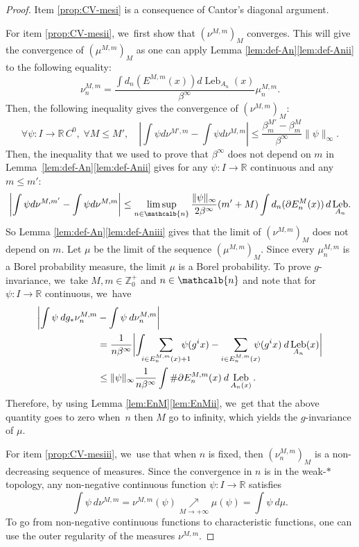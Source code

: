 \documentclass[JEP,XML,SOM,Unicode,NoFloatCountersInSection,published]{cedram}
\DeclareMathOperator{\Leb}{Leb}
\newcommand{\mcbn}{{\mathcalb{n}}}
\theoremstyle{definition}
\newcommand{\bbR}{{\mathbb{R}}}
\newcommand{\bbZ}{{\mathbb{Z}}}
\begin{document}
\begin{proof}
Item \eqref{prop:CV-mesi} is a consequence of Cantor's diagonal argument.

For item \eqref{prop:CV-mesii}, we~first show that $(\nu^{M,m})_M$ converges. This will give the convergence of $(\mu^{M,m})_M$ as one can apply Lemma \ref{lem:def-An}\eqref{lem:def-Anii} to the following equality:
\[
\nu_n^{M,m} = \frac{\int d_n(E^{M,m}(x)) d\Leb_{A_n}(x)}{\beta^{\infty}} \mu_n^{M,m}.
\]
Then, the following inequality gives the convergence of $(\nu^{M,m})_M$:
\[
\forall \psi : I \rightarrow \bbR \,C^0,\; \forall M \leq M',\quad
\left|\int \psi d \nu^{M',m} - \int \psi d \nu^{M,m}\right|
\leq \frac{\beta_m^{M'} - \beta_m^M}{\beta^{\infty}} \| \psi \|_{\infty}.
\]
Then, the inequality that we used to prove that $\beta^{\infty}$ does not depend on $m$ in Lem\-ma~\ref{lem:def-An}\eqref{lem:def-Anii} gives for any $\psi : I \to \bbR \text{ continuous}$ and any $m \leq m'$:
\[
\left | \int \psi d \nu^{M,m'} - \int \psi d \nu^{M,m} \right | \leq \limsup_{n \in \mcbn} \frac{\| \psi \|_{\infty}}{2 \beta^{\infty}} (m' + M) \int d_n(\partial E_n^M(x))\, d \Leb_{A_n}\!.
\]
So Lemma \ref{lem:def-An}\eqref{lem:def-Aniii} gives that the limit of $(\nu^{M,m})_M$ does not depend on $m$.
Let $\mu$ be the limit of the sequence $(\mu^{M,m})_M$. Since every $\mu_n^{M,m}$ is a Borel probability measure, the limit $\mu$ is a Borel probability. To prove $g$-invariance, we~take $M,m \in \bbZ_0^+$ and $n \in \mcbn$ and note that for $\psi : I \to \bbR$ continuous, we~have
\begin{align*}
\biggl | \int \psi \: d g_* \nu_n^{M,m} &- \int \psi \: d \nu_n^{M,m} \biggr |\\
&= \frac{1}{n \beta^{\infty} }\biggl | \int \hspace{-2mm} \sum_{i \in E_n^{M,m}(x)+1}\hspace{-4mm} \psi(g^i x) - \sum_{i \in E_n^{M,m}(x)} \hspace{-3mm}\psi(g^i x) \: d \Leb_{A_n}(x) \biggr |\\
&\leq \| \psi \|_{\infty} \frac{1}{n \beta^{\infty} } \int \# \partial E_n^{M,m}(x) \: d\Leb_{A_n(x)}.
\end{align*}
Therefore, by using Lemma \ref{lem:EnM}\eqref{lem:EnMii}, we~get that the above quantity goes to zero when~$n$ then $M$ go to infinity, which yields the $g$-invariance of $\mu$.

For item \eqref{prop:CV-mesiii}, we~use that when $n$ is fixed, then $(\nu_n^{M,m})_M$ is a non-decreasing sequence of measures. Since the convergence in $n$ is in the weak\nobreakdash-$*$ topology, any non-negative continuous function $\psi : I \to \bbR$ satisfies
\[
\int \psi \: d \nu^{M,m} =\nu^{M,m}(\psi) \!\underset{M \to +\infty}{\nearrow}\! \mu(\psi) = \int \psi \: d \mu.
\]
To go from non-negative continuous functions to characteristic functions, one can use the outer regularity of the measures $\nu^{M,m}$.
\end{proof}
\end{document}
